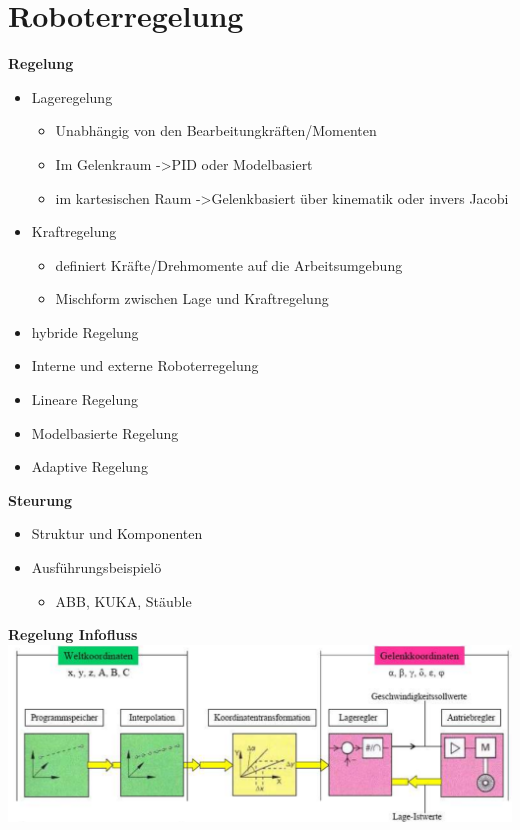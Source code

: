 \section{Roboterregelung }
\begin{minipage}{0.5\linewidth}
    \textbf{Regelung}
    \begin{itemize}
        \item Lageregelung
        \begin{itemize}
            \item Unabhängig von den Bearbeitungkräften/Momenten
            \item Im Gelenkraum ->PID oder Modelbasiert
            \item im kartesischen Raum ->Gelenkbasiert über kinematik oder invers Jacobi
        \end{itemize}
        \item Kraftregelung
        \begin{itemize}
            \item definiert Kräfte/Drehmomente auf die Arbeitsumgebung
        \end{itemize}
        \begin{itemize}
            \item Mischform zwischen Lage und Kraftregelung
        \end{itemize}
        \item hybride Regelung
        \item Interne und externe Roboterregelung
        \item Lineare Regelung
        \item Modelbasierte Regelung
        \item Adaptive Regelung
    \end{itemize}
\end{minipage}
\begin{minipage}{0.5\linewidth}
    \textbf{Steurung}
    \begin{itemize}
        \item Struktur und Komponenten
        \item Ausführungsbeispielö
        \begin{itemize}
            \item ABB, KUKA, Stäuble
        \end{itemize}
    \end{itemize}
\end{minipage}
\textbf{Regelung Infofluss}\newline
    \includegraphics[width=\linewidth]{./bilder/RegelungInfofluss}

